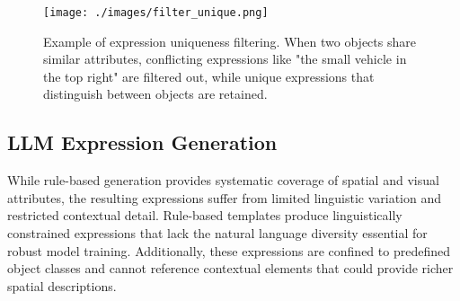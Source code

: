 \begin{figure}[t]
\centering
\begin{minipage}{0.5\textwidth}
\centering
\texttt{[image: ./images/filter\_unique.png]}
\end{minipage}%
\begin{minipage}{0.5\textwidth}
\centering
\hspace{-1cm}
\end{minipage}
\caption{Example of expression uniqueness filtering. When two objects share similar attributes, conflicting expressions like "the small vehicle in the top right" are filtered out, while unique expressions that distinguish between objects are retained.}
\label{fig:filter_unique_example}
\end{figure}

\subsection{LLM Expression Generation}

While rule-based generation provides systematic coverage of spatial and visual attributes, the resulting expressions suffer from limited linguistic variation and restricted contextual detail. Rule-based templates produce linguistically constrained expressions that lack the natural language diversity essential for robust model training. Additionally, these expressions are confined to predefined object classes and cannot reference contextual elements that could provide richer spatial descriptions.

